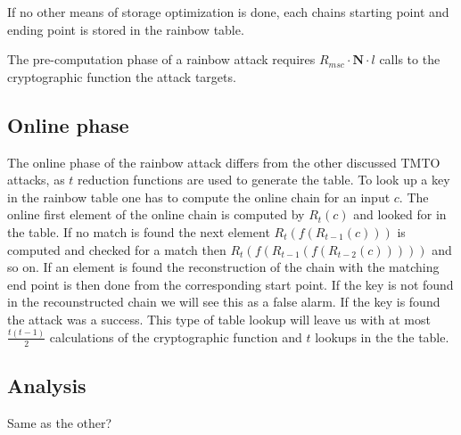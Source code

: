 If no other means of storage optimization is done, each chains
starting point and ending point is stored in the rainbow table.

The pre-computation phase of a rainbow attack requires
$R_{msc} \cdot \textbf{N} \cdot l$ calls to the cryptographic function the attack targets.

\subsection{Online phase}
\label{sec:onlinerb}

The online phase of the rainbow attack differs from the other
discussed TMTO attacks, as $t$ reduction functions are used to
generate the table. To look up a key in the rainbow table one has to
compute the online chain for an input $c$. The online first element of
the online chain is computed by $R_t(c)$ and looked for in the
table. If no match is found the next element $R_t(f(R_{t-1}(c)))$ is
computed and checked for a match then $R_t(f(R_{t-1}(f(R_{t-2}(c)))))$
and so on. If an element is found the reconstruction of the chain with
the matching end point is then done from the corresponding start
point. If the key is not found in the recounstructed chain we will see
this as a false alarm. If the key is found the attack was a
success. This type of table lookup will leave us with at most
$\frac{t(t - 1)}{2}$ calculations of the cryptographic function and
$t$ lookups in the the table.

\subsection{Analysis}

Same as the other?



